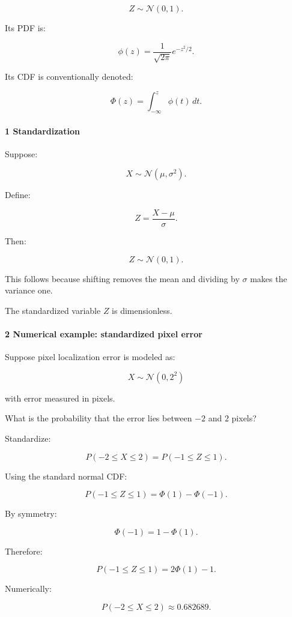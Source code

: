 \[
 \boxed{Z\sim\mathcal N(0,1)}.
\]

Its PDF is:

\[
 \boxed{ \phi(z)= \frac1{\sqrt{2\pi}}e^{-z^2/2} }.
\]

Its CDF is conventionally denoted:

\[
 \boxed{ \Phi(z)= \int_{-\infty}^{z}\phi(t)\,dt }.
\]

\paragraph{1 Standardization}\label{standardization}

Suppose:

\[
 X\sim\mathcal N(\mu,\sigma^2).
\]

Define:

\[
 \boxed{ Z=\frac{X-\mu}{\sigma} }.
\]

Then:

\[
 Z\sim\mathcal N(0,1).
\]

This follows because shifting removes the mean and dividing by \(\sigma\) makes the variance one.

The standardized variable \(Z\) is dimensionless.

\paragraph{2 Numerical example: standardized pixel error}\label{numerical-example-standardized-pixel-error}

Suppose pixel localization error is modeled as:

\[
 X\sim\mathcal N(0,2^2)
\]

with error measured in pixels.

What is the probability that the error lies between \(-2\) and \(2\) pixels?

Standardize:

\[
 P(-2\le X\le2) = P\left(-1\le Z\le1\right).
\]

Using the standard normal CDF:

\[
 P(-1\le Z\le1) = \Phi(1)-\Phi(-1).
\]

By symmetry:

\[
 \Phi(-1)=1-\Phi(1).
\]

Therefore:

\[
 P(-1\le Z\le1) = 2\Phi(1)-1.
\]

Numerically:

\[
 \boxed{P(-2\le X\le2)\approx0.682689}.
\]

